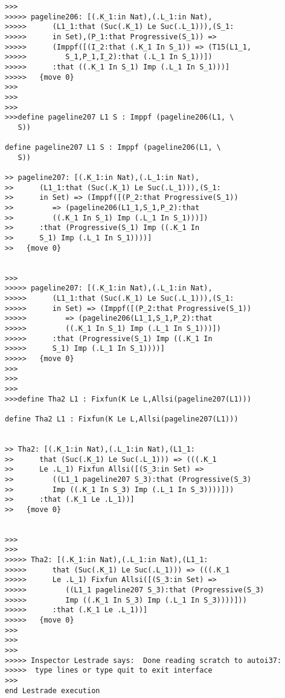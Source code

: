 \documentclass{article}
\begin{document}
\begin{verbatim}
>>>
>>>>> pageline206: [(.K_1:in Nat),(.L_1:in Nat),
>>>>>      (L1_1:that (Suc(.K_1) Le Suc(.L_1))),(S_1:
>>>>>      in Set),(P_1:that Progressive(S_1)) =>
>>>>>      (Imppf([(I_2:that (.K_1 In S_1)) => (T15(L1_1,
>>>>>         S_1,P_1,I_2):that (.L_1 In S_1))])
>>>>>      :that ((.K_1 In S_1) Imp (.L_1 In S_1)))]
>>>>>   {move 0}
>>>
>>>
>>>
>>>define pageline207 L1 S : Imppf (pageline206(L1, \
   S))

define pageline207 L1 S : Imppf (pageline206(L1, \
   S))

>> pageline207: [(.K_1:in Nat),(.L_1:in Nat),
>>      (L1_1:that (Suc(.K_1) Le Suc(.L_1))),(S_1:
>>      in Set) => (Imppf([(P_2:that Progressive(S_1))
>>         => (pageline206(L1_1,S_1,P_2):that
>>         ((.K_1 In S_1) Imp (.L_1 In S_1)))])
>>      :that (Progressive(S_1) Imp ((.K_1 In
>>      S_1) Imp (.L_1 In S_1))))]
>>   {move 0}


>>>
>>>>> pageline207: [(.K_1:in Nat),(.L_1:in Nat),
>>>>>      (L1_1:that (Suc(.K_1) Le Suc(.L_1))),(S_1:
>>>>>      in Set) => (Imppf([(P_2:that Progressive(S_1))
>>>>>         => (pageline206(L1_1,S_1,P_2):that
>>>>>         ((.K_1 In S_1) Imp (.L_1 In S_1)))])
>>>>>      :that (Progressive(S_1) Imp ((.K_1 In
>>>>>      S_1) Imp (.L_1 In S_1))))]
>>>>>   {move 0}
>>>
>>>
>>>
>>>define Tha2 L1 : Fixfun(K Le L,Allsi(pageline207(L1)))

define Tha2 L1 : Fixfun(K Le L,Allsi(pageline207(L1)))


>> Tha2: [(.K_1:in Nat),(.L_1:in Nat),(L1_1:
>>      that (Suc(.K_1) Le Suc(.L_1))) => (((.K_1
>>      Le .L_1) Fixfun Allsi([(S_3:in Set) =>
>>         ((L1_1 pageline207 S_3):that (Progressive(S_3)
>>         Imp ((.K_1 In S_3) Imp (.L_1 In S_3))))]))
>>      :that (.K_1 Le .L_1))]
>>   {move 0}


>>>
>>>
>>>>> Tha2: [(.K_1:in Nat),(.L_1:in Nat),(L1_1:
>>>>>      that (Suc(.K_1) Le Suc(.L_1))) => (((.K_1
>>>>>      Le .L_1) Fixfun Allsi([(S_3:in Set) =>
>>>>>         ((L1_1 pageline207 S_3):that (Progressive(S_3)
>>>>>         Imp ((.K_1 In S_3) Imp (.L_1 In S_3))))]))
>>>>>      :that (.K_1 Le .L_1))]
>>>>>   {move 0}
>>>
>>>
>>>
>>>>> Inspector Lestrade says:  Done reading scratch to autoi37:
>>>>>  type lines or type quit to exit interface
>>>
end Lestrade execution
\end{verbatim}
\end{document}
